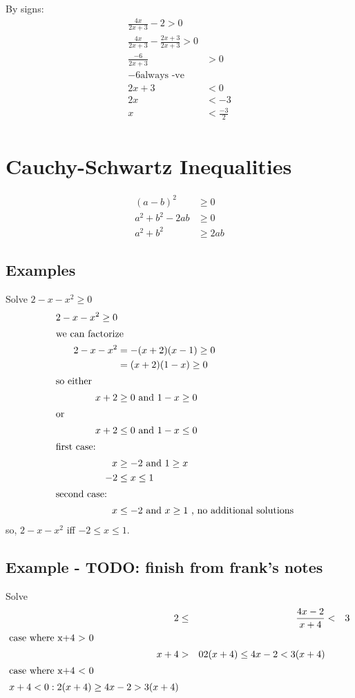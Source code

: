 By signs:
\begin{align}
  \frac{4x}{2x+3} -2 > 0 \\
  \frac{4x}{2x+3} -\frac{2x+3}{2x+3} > 0 \\
  \frac{-6}{2x+3} & > 0 \\
  -6 \text{always -ve} \\
  2x + 3 & < 0 \\
  2x &< -3 \\
  x & < \frac{-3}{2} \\
\end{align}

\section{Cauchy-Schwartz Inequalities}
\begin{align}
  (a-b)^2 &\geq 0 \\
  a^2 + b^2 -2ab &\geq 0 \\
  a^2 +b^2 &\geq 2ab %
\end{align}

\subsection{Examples}
Solve $2 -x -x^2 \geq 0$
\begin{align}
2 -x -x^2 \geq 0 \\
\intertext{we can factorize}
  2 -x -x^2 &= -(x+2)(x-1) \geq 0 \\
  &= (x+2)(1-x) \geq 0 \\
\intertext{so either}
  x+2 &\geq 0 ~ \text{and} ~ 1-x \geq 0 \\
\intertext{or}
  x+2 &\leq 0 ~ \text{and} ~ 1-x \leq 0 \\
\intertext{first case:}
  x & \geq -2 ~\text{and}~ 1 \geq x \\
  -2 & \leq x \leq 1 \\
\intertext{second case:}
  x &\leq -2 ~\text{and}~ x \geq 1 ~\text{, no additional solutions}
\end{align}
so, $2-x-x^2$ iff $-2 \leq x \leq 1$.

\subsection{Example - TODO: finish from frank's notes}
Solve 
\begin{align}
  2 &\leq& \frac{4x-2}{x+4} &<& 3 \\
\intertext{case where x+4 > 0}
x + 4 &>& 0 2(x+4) \leq 4x-2 < 3(x+4) \\
\intertext{case where x+4 < 0}
x+4 < 0 : 2(x+4) \geq 4x-2 > 3(x+4)
\end{align}